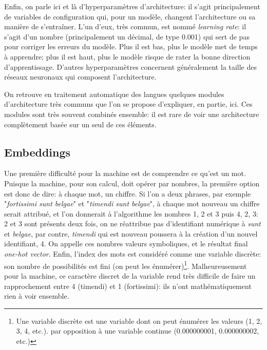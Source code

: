 Enfin, on parle ici et là d'hyperparamètres d'architecture: il s'agit principalement de variables de configuration qui, pour un modèle, changent l'architecture ou sa manière de s'entraîner. L'un d'eux, très commun, est nommé \textit{learning rate}: il s'agit d'un nombre (principalement un décimal, de type 0.001) qui sert de pas pour corriger les erreurs du modèle. Plus il est bas, plus le modèle met de temps à apprendre; plus il est haut, plus le modèle risque de rater la bonne direction d'apprentissage. D'autres hyperparamètres concernent généralement la taille des réseaux neuronaux qui composent l'architecture. 

On retrouve en traitement automatique des langues quelques modules d'architecture très communs que l'on se propose d'expliquer, en partie, ici. Ces modules sont très souvent combinés ensemble: il est rare de voir une architecture complètement basée sur un seul de ces éléments.

\subsection{Embeddings}
\label{deep-learning:embeddings}

Une première difficulté pour la machine est de comprendre ce qu'est un mot. Puisque la machine, pour son calcul, doit opérer par nombres, la première option est donc de dire: à chaque mot, un chiffre. Si l'on a deux phrases, par exemple "\textit{fortissimi sunt belgae}" et "\textit{timendi sunt belgae}", à chaque mot nouveau un chiffre serait attribué, et l'on donnerait à l'algorithme les nombres 1, 2 et 3 puis 4, 2, 3: 2 et 3 sont présents deux fois, on ne réattribue pas d'identifiant numérique à \textit{sunt} et \textit{belgae}, par contre, \textit{timendi} qui est nouveau poussera à la création d'un nouvel identifiant, 4. On appelle ces nombres valeurs symboliques, et le résultat final \textit{one-hot vector}. Enfin, l'index des mots est considéré comme une variable discrète: son nombre de possibilités est fini (on peut les énumérer)\footnote{Une variable discrète est une variable dont on peut énumérer les valeurs (1, 2, 3, 4, etc.). par opposition à une variable continue (0.000000001, 0.000000002, etc.)}. Malheureusement pour la machine, ce caractère discret de la variable rend très difficile de faire un rapprochement entre 4 (timendi) et 1 (fortissimi): ils n'ont mathématiquement rien à voir ensemble. 

